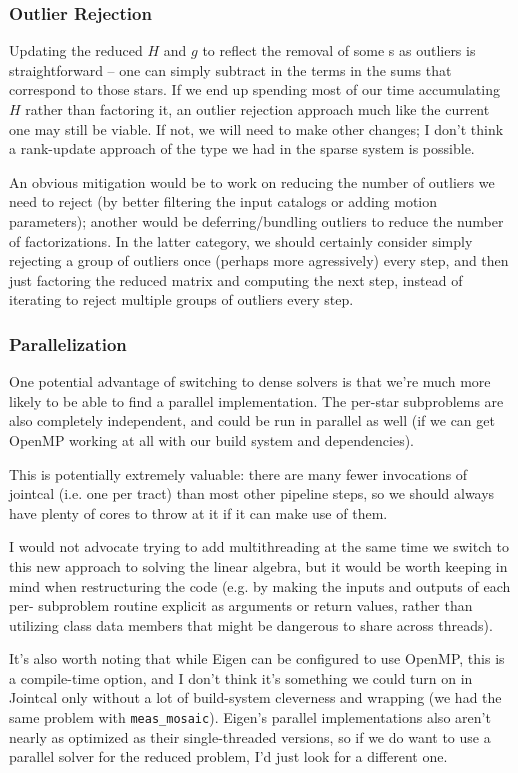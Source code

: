\subsubsection{Outlier Rejection}

Updating the reduced $H$ and $g$ to reflect the removal of some s as outliers is straightforward -- one can simply subtract in the terms in the sums that correspond to those stars.
If we end up spending most of our time accumulating $H$ rather than factoring it, an outlier rejection approach much like the current one may still be viable.
If not, we will need to make other changes; I don't think a rank-update approach of the type we had in the sparse system is possible.

An obvious mitigation would be to work on reducing the number of outliers we need to reject (by better filtering the input catalogs or adding motion parameters); another would be deferring/bundling outliers to reduce the number of factorizations.
In the latter category, we should certainly consider simply rejecting a group of outliers once (perhaps more agressively) every step, and then just factoring the reduced matrix and computing the next step, instead of iterating to reject multiple groups of outliers every step.

\subsubsection{Parallelization}

One potential advantage of switching to dense solvers is that we're much more likely to be able to find a parallel implementation.
The per-star subproblems are also completely independent, and could be run in parallel as well (if we can get OpenMP working at all with our build system and dependencies).

This is potentially extremely valuable: there are many fewer invocations of jointcal (i.e. one per tract) than most other pipeline steps, so we should always have plenty of cores to throw at it if it can make use of them.

I would not advocate trying to add multithreading at the same time we switch to this new approach to solving the linear algebra, but it would be worth keeping in mind when restructuring the code (e.g. by making the inputs and outputs of each per- subproblem routine explicit as arguments or return values, rather than utilizing class data members that might be dangerous to share across threads).

It's also worth noting that while Eigen can be configured to use OpenMP, this is a compile-time option, and I don't think it's something we could turn on in Jointcal only without a lot of build-system cleverness and wrapping (we had the same problem with \texttt{meas\_mosaic}).
Eigen's parallel implementations also aren't nearly as optimized as their single-threaded versions, so if we do want to use a parallel solver for the reduced problem, I'd just look for a different one.
